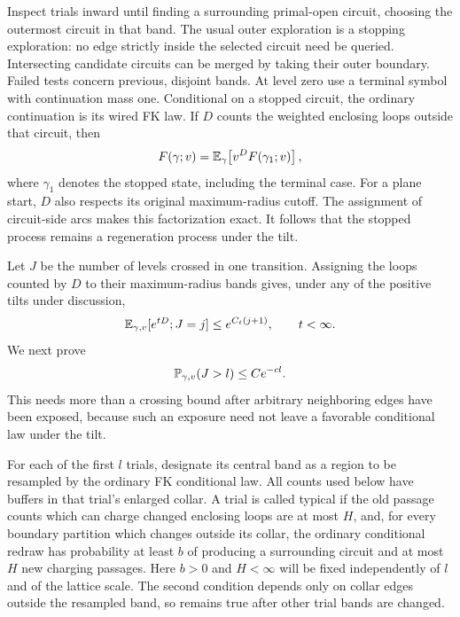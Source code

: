 Inspect trials inward until finding a surrounding primal-open
circuit, choosing the outermost circuit in that band. The usual
outer exploration is a stopping exploration: no edge strictly inside
the selected circuit need be queried. Intersecting candidate circuits
can be merged by taking their outer boundary. Failed tests concern
previous, disjoint bands. At level zero use a terminal symbol with
continuation mass one. Conditional on a stopped circuit, the ordinary
continuation is its wired FK law. If $D$ counts the weighted enclosing
loops outside that circuit, then
\begin{equation}\label{eq:radial-transition}
 F(\gamma;v)=\mathbb E_\gamma\!\left[v^D F(\gamma_1;v)\right],
\end{equation}
where $\gamma_1$ denotes the stopped state, including the terminal
case. For a plane start, $D$ also respects its original maximum-radius
cutoff. The assignment of circuit-side arcs makes this factorization
exact. It follows that the stopped process remains a regeneration
process under the tilt.

Let $J$ be the number of levels crossed in one transition. Assigning
the loops counted by $D$ to their maximum-radius bands gives, under
any of the positive tilts under discussion,
\begin{equation}\label{eq:radial-jump-cost}
 \mathbb E_{\gamma,v}[e^{tD};J=j]\le e^{C_t(j+1)},\qquad t<\infty.
\end{equation}
We next prove
\begin{equation}\label{eq:radial-jump-tail}
 \mathbb P_{\gamma,v}(J>l)\le Ce^{-cl}.
\end{equation}
This needs more than a crossing bound after arbitrary neighboring
edges have been exposed, because such an exposure need not leave a
favorable conditional law under the tilt.

For each of the first $l$ trials, designate its central band as a
region to be resampled by the ordinary FK conditional law. All counts
used below have buffers in that trial's enlarged collar. A trial is
called typical if the old passage counts which can charge changed
enclosing loops are at most $H$, and, for every boundary partition
which changes outside its collar, the ordinary conditional redraw
has probability at least $b$ of producing a surrounding circuit and
at most $H$ new charging passages. Here $b>0$ and $H<\infty$ will be
fixed independently of $l$ and of the lattice scale. The second
condition depends only on collar edges outside the resampled band,
so remains true after other trial bands are changed.


